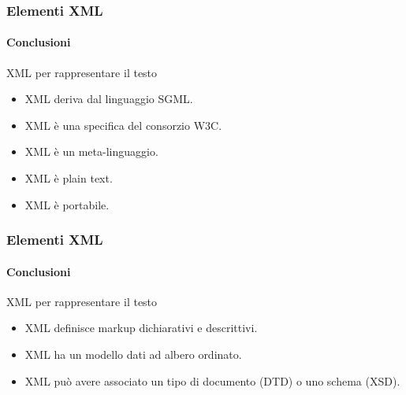 \begin{frame}
    \frametitle{Elementi XML}
    \framesubtitle{Conclusioni}
    \addtocounter{nframe}{1}

    \begin{block}{XML per rappresentare il testo}
        \begin{itemize}
            \item XML deriva dal linguaggio SGML.
            \item XML è una specifica del consorzio W3C.
            \item XML è un meta-linguaggio.
            \item XML è plain text.
            \item XML è portabile.
        \end{itemize}

    \end{block}

\end{frame}

\begin{frame}
    \frametitle{Elementi XML}
    \framesubtitle{Conclusioni}
    \addtocounter{nframe}{1}

    \begin{block}{XML per rappresentare il testo}
        \begin{itemize}
            \item XML definisce markup dichiarativi e descrittivi.
            \item XML ha un modello dati ad albero ordinato.
            \item XML può avere associato un tipo di documento (DTD) o uno schema (XSD).
        \end{itemize}

    \end{block}

\end{frame}
